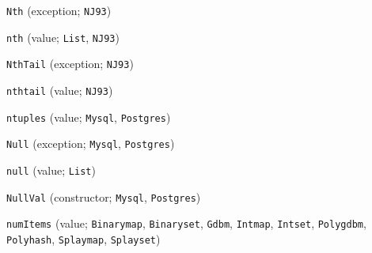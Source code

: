 \begin{description}
\item[] \verb"Nth" (exception; \verb"NJ93")
\item[] \verb"nth" (value; \verb"List", \verb"NJ93")
\item[] \verb"NthTail" (exception; \verb"NJ93")
\item[] \verb"nthtail" (value; \verb"NJ93")
\item[] \verb"ntuples" (value; \verb"Mysql", \verb"Postgres")
\item[] \verb"Null" (exception; \verb"Mysql", \verb"Postgres")
\item[] \verb"null" (value; \verb"List")
\item[] \verb"NullVal" (constructor; \verb"Mysql", \verb"Postgres")
\item[] \verb"numItems" (value; \verb"Binarymap", \verb"Binaryset", \verb"Gdbm", \verb"Intmap", \verb"Intset", \verb"Polygdbm", \verb"Polyhash", \verb"Splaymap", \verb"Splayset")
\\[2ex]


\end{description}
